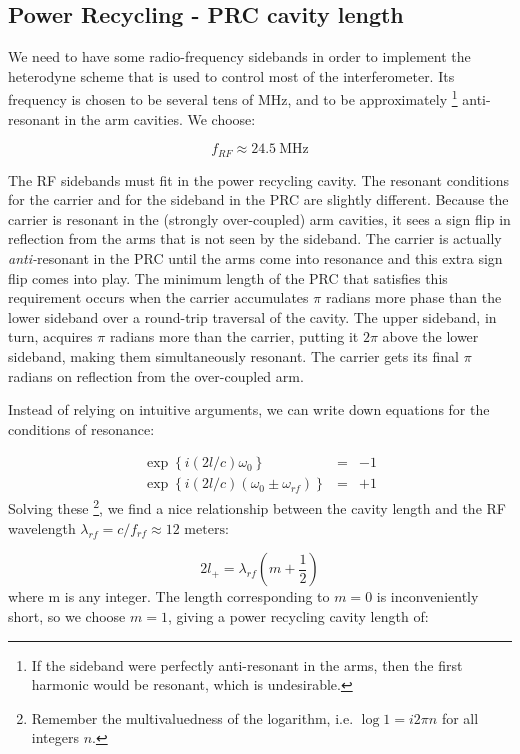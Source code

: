 \subsection*{Power Recycling - PRC cavity length}

We need to have some radio-frequency sidebands in order to implement
the heterodyne scheme that is used to control most of the interferometer.
Its frequency is chosen to be several tens of MHz, and to be approximately%
\footnote{If the sideband were perfectly anti-resonant in the arms, then the
first harmonic would be resonant, which is undesirable.%
} anti-resonant in the arm cavities. We choose:

\[
f_{RF}\approx24.5\mathrm{{\ MHz}}
\]

The RF sidebands must fit in the power recycling cavity. The resonant
conditions for the carrier and for the sideband in the PRC are slightly
different. Because the carrier is resonant in the (strongly over-coupled)
arm cavities, it sees a sign flip in reflection from the arms that
is not seen by the sideband. The carrier is actually \emph{anti-}resonant
in the PRC until the arms come into resonance and this extra sign
flip comes into play. The minimum length of the PRC that satisfies
this requirement occurs when the carrier accumulates $\pi$ radians
more phase than the lower sideband over a round-trip traversal of
the cavity. The upper sideband, in turn, acquires $\pi$ radians
more than the carrier, putting it $2\pi$ above the lower sideband,
making them simultaneously resonant. The carrier gets its final $\pi$
radians on reflection from the over-coupled arm.

Instead of relying
on intuitive arguments, we can write down equations for the conditions
of resonance:

\begin{eqnarray}
\exp \left\{i (2l/c)\omega_{0}  \right\} &=& -1 \\
\exp \left\{i (2l/c)(\omega_{0} \pm \omega_{rf}) \right\} &=& +1
\end{eqnarray}Solving these%
\footnote{Remember the multivaluedness of the logarithm, i.e. $\log1=i2\pi n$
for all integers $n$.%
}, we find a nice relationship between the cavity length and the RF
wavelength $\lambda_{rf}=c/f_{rf}\approx12\text{ meters}$:

\[
2l_{+}=\lambda_{rf}\left(m+\frac{1}{2}\right)
\]
where m is any integer. The length corresponding to $m=0$ is inconveniently
short, so we choose $m=1$, giving a power recycling cavity length of:


